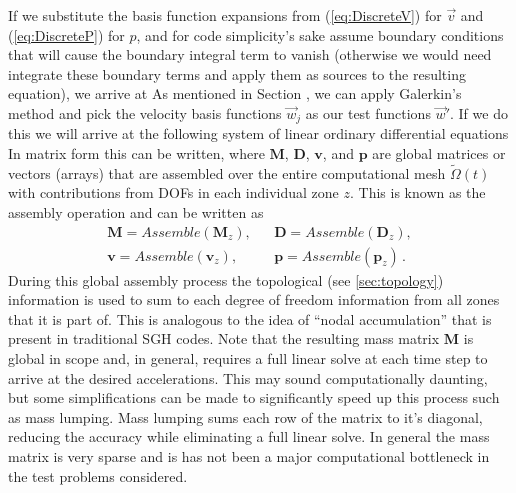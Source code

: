 If we substitute the basis function expansions from (\ref{eq:DiscreteV}) for $\vec{v}$ and (\ref{eq:DiscreteP}) for $p$, and for code simplicity's sake assume boundary conditions that will cause the boundary integral term to vanish (otherwise we would need integrate these boundary terms and apply them as sources to the resulting equation), we arrive at
As mentioned in Section , we can apply Galerkin's method and pick the velocity basis functions $\vec{w}_j$ as our test functions $\vec w'$. If we do this we will arrive at the following system of linear ordinary differential equations
In matrix form this can be written,
where $\mathbf{M}$, $\mathbf{D}$, $\mathbf{v}$, and $\mathbf{p}$ are global matrices or vectors (arrays) that are assembled over the entire computational mesh $\tilde\Omega(t)$ with contributions from DOFs in each individual zone $z$. This is known as the assembly operation and can be written as
\begin{eqnarray*}
  \mathbf{M} = Assemble(\mathbf{M}_z), && \mathbf{D} = Assemble(\mathbf{D}_z), \\
  \mathbf{v} = Assemble(\mathbf{v}_z), && \mathbf{p} = Assemble(\mathbf{p}_z) \,.
\end{eqnarray*}
During this global assembly process the topological (see \ref{sec:topology}) information is used to sum to each degree of freedom information from all zones that it is part of. This is analogous to the idea of ``nodal accumulation'' that is present in traditional SGH codes. Note that the resulting mass matrix $\mathbf{M}$ is global in scope and, in general, requires a full linear solve \label{sec:FullLinearSolve} at each time step to arrive at the desired accelerations. This may sound computationally daunting, but some simplifications can be made to significantly speed up this process such as mass lumping. Mass lumping sums each row of the matrix to it's diagonal, reducing the accuracy while eliminating a full linear solve. In general the mass matrix is very sparse and is has not been a major computational bottleneck in the test problems considered. 

